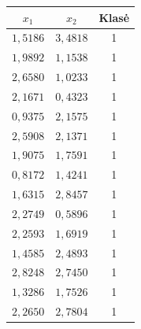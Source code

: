 \begin{minipage}{0.45\textwidth}
    \centering
    \begin{tabular}{|c|c|c|}
        \hline
        $x_1$ & $x_2$ & Klasė \\
        \hline
        $1{,}5186$ & $3{,}4818$ & 1 \\ \hline
        $1{,}9892$ & $1{,}1538$ & 1 \\ \hline
        $2{,}6580$ & $1{,}0233$ & 1 \\ \hline
        $2{,}1671$ & $0{,}4323$ & 1 \\ \hline
        $0{,}9375$ & $2{,}1575$ & 1 \\ \hline
        $2{,}5908$ & $2{,}1371$ & 1 \\ \hline
        $1{,}9075$ & $1{,}7591$ & 1 \\ \hline
        $0{,}8172$ & $1{,}4241$ & 1 \\ \hline
        $1{,}6315$ & $2{,}8457$ & 1 \\ \hline
        $2{,}2749$ & $0{,}5896$ & 1 \\ \hline
        $2{,}2593$ & $1{,}6919$ & 1 \\ \hline
        $1{,}4585$ & $2{,}4893$ & 1 \\ \hline
        $2{,}8248$ & $2{,}7450$ & 1 \\ \hline
        $1{,}3286$ & $1{,}7526$ & 1 \\ \hline
        $2{,}2650$ & $2{,}7804$ & 1 \\ \hline
    \end{tabular}
    \label{tab:klase1}
\end{minipage}